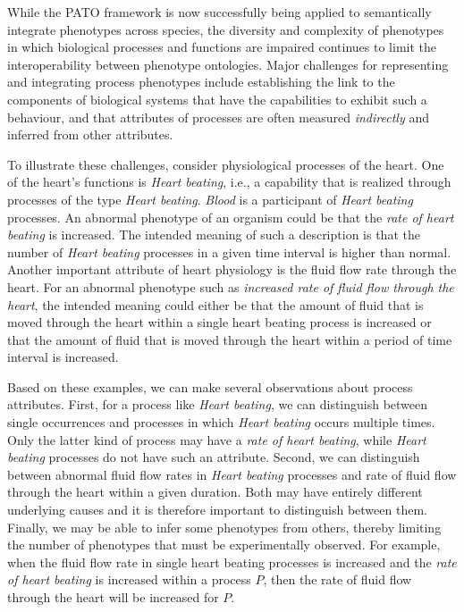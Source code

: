 \documentclass{bioinfo}
\begin{document}
While the PATO framework is now successfully being applied to
semantically integrate phenotypes across species, the diversity and
complexity of phenotypes in which biological processes and functions
are impaired continues to limit the interoperability between phenotype
ontologies. Major challenges for representing and integrating process
phenotypes include establishing the link to the components of
biological systems that have the capabilities to exhibit such a
behaviour, and that attributes of processes are often measured {\em
  indirectly} and inferred from other attributes.

To illustrate these challenges, consider physiological processes of
the heart. One of the heart's functions is {\em Heart beating}, i.e.,
a capability that is realized through processes of the type {\em Heart
  beating}. {\em Blood} is a participant of {\em Heart beating}
processes.  An abnormal phenotype of an organism could be that the
{\em rate of heart beating} is increased. The intended meaning of such
a description is that the number of {\em Heart beating} processes in a
given time interval is higher than normal. Another important attribute
of heart physiology is the fluid flow rate through the heart. For an
abnormal phenotype such as {\em increased rate of fluid flow through
  the heart}, the intended meaning could either be that the amount of
fluid that is moved through the heart within a single heart beating
process is increased or that the amount of fluid that is moved through
the heart within a period of time interval is increased. 

Based on these examples, we can make several observations about
process attributes. First, for a process like {\em Heart beating}, we
can distinguish between single occurrences and processes in which {\em
  Heart beating} occurs multiple times. Only the latter kind of
process may have a {\em rate of heart beating}, while {\em Heart
  beating} processes do not have such an attribute. Second, we can
distinguish between abnormal fluid flow rates in {\em Heart beating}
processes and rate of fluid flow through the heart within a given
duration. Both may have entirely different underlying causes and it is
therefore important to distinguish between them. Finally, we may be
able to infer some phenotypes from others, thereby limiting the number
of phenotypes that must be experimentally observed. For example, when
the fluid flow rate in single heart beating processes is increased and
the {\em rate of heart beating} is increased within a process $P$,
then the rate of fluid flow through the heart will be increased for
$P$.
\end{document}
